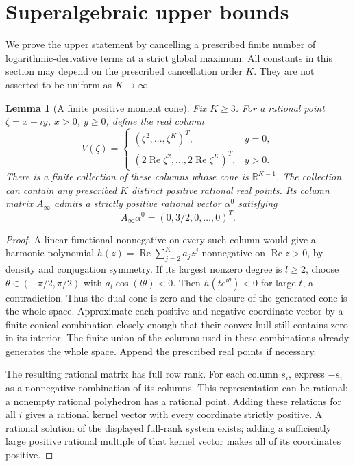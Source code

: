 \documentclass[11pt]{article}
\newtheorem{lemma}[theorem]{Lemma}
\theoremstyle{remark}\newtheorem{remark}[theorem]{Remark}
\newcommand{\Rea}{\operatorname{Re}}
\begin{document}
\section{Superalgebraic upper bounds}\label{sec:upper}
We prove the upper statement by cancelling a prescribed finite number of
logarithmic-derivative terms at a strict global maximum. All constants in
this section may depend on the prescribed cancellation order \(K\).
They are not asserted to be uniform as \(K\to\infty\).

\begin{lemma}[A finite positive moment cone]\label{lem:cone}
Fix \(K\ge3\). For a rational point \(\zeta=x+iy\), \(x>0\), \(y\ge0\),
define the real column
\[
 V(\zeta)=
 \begin{cases}
  (\zeta^2,\ldots,\zeta^K)^T,&y=0,\\
  (2\Rea\zeta^2,\ldots,2\Rea\zeta^K)^T,&y>0.
 \end{cases}
\]
There is a finite collection of these columns whose cone is
\(\mathbb R^{K-1}\). The collection can contain any prescribed \(K\)
distinct positive rational real points. Its column matrix \(A_\infty\)
admits a strictly positive rational vector \(\alpha^0\) satisfying
\[
 A_\infty\alpha^0=(0,3/2,0,\ldots,0)^T.
\]
\end{lemma}
\begin{proof}
A linear functional nonnegative on every such column would give a
harmonic polynomial \(h(z)=\Rea\sum_{j=2}^K a_jz^j\) nonnegative on
\(\Rea z>0\), by density and conjugation symmetry. If its largest
nonzero degree is \(l\ge2\), choose
\(\theta\in(-\pi/2,\pi/2)\) with \(a_l\cos(l\theta)<0\).
Then \(h(te^{i\theta})<0\) for large \(t\), a contradiction.
Thus the dual cone is zero and the closure of the generated cone is
the whole space. Approximate each positive and negative coordinate
vector by a finite conical combination closely enough that their
convex hull still contains zero in its interior. The finite union of
the columns used in these combinations already generates the whole
space. Append the prescribed real points if necessary.

The resulting rational matrix has full row rank. For each column
\(s_i\), express \(-s_i\) as a nonnegative combination of its columns.
This representation can be rational: a nonempty rational polyhedron
has a rational point. Adding these relations for all \(i\) gives a
rational kernel vector with every coordinate strictly positive.
A rational solution of the displayed full-rank system exists; adding
a sufficiently large positive rational multiple of that kernel vector
makes all of its coordinates positive.
\end{proof}
\end{document}
